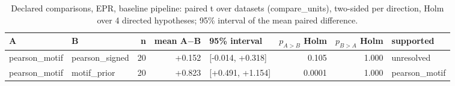 \begin{table}[H]\centering\small
\caption{Declared comparisons, EPR, baseline pipeline: paired t over datasets (compare\_units), two-sided per direction, Holm over 4 directed hypotheses; 95\% interval of the mean paired difference.}
\begin{tabular}{llrrlrrl}\toprule
A & B & n & mean A$-$B & 95\% interval & $p_{A>B}$ Holm & $p_{B>A}$ Holm & supported \\ \midrule
pearson\_motif & pearson\_signed & 20 & +0.152 & [-0.014, +0.318] & 0.105 & 1.000 & unresolved \\
pearson\_motif & motif\_prior & 20 & +0.823 & [+0.491, +1.154] & 0.0001 & 1.000 & pearson\_motif \\
\bottomrule\end{tabular}\end{table}
